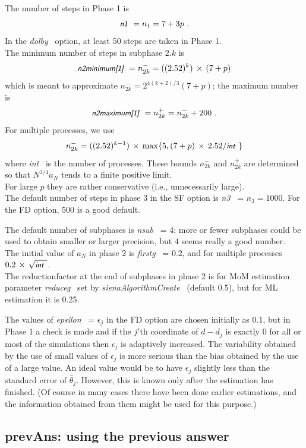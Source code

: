 \documentclass[a4paper,12pt,fleqn]{article}
\newcommand{\ttimes}{\,\times\,}
\newcommand{\nnm}[1]{\textsf{\small\textit{#1}\ }}
\begin{document}
The number of steps in Phase 1 is
\[
\nnm{n1} =  n_1 = 7 + 3p \ .
\]
In the \nnm{dolby} option, at least 50 steps are taken in Phase 1.\\
The minimum number of steps in subphase $2.k$ is
\[
\nnm{n2minimum[1]} = n_{2k}^- = ((2.52)^k)\ttimes(7+p)
\]
 which is meant to approximate
$n_{2k}^- = 2^{4(k+2)/3}(7+p)$;
the maximum number is
\[
\nnm{n2maximum[1]} = n_{2k}^+ = n_{2k}^- + 200 \ .
\]
For multiple processes, we use
\[
  n_{2k}^- = ((2.52)^{k-1})\ttimes \max \{5, (7+p)\ttimes 2.52/\nnm{int}\}
\]
where \nnm{int} is the number of processes.
These bounds $n_{2k}^-$ and $n_{2k}^+$ are determined so that
$N^{3/4} a_N$ tends to a finite positive limit.\\
For large $p$ they are rather conservative (i.e., unnecessarily large).\\
The default number of steps in phase 3 in the SF option is \nnm{n3} = $n_3 = 1000$.
For the FD option, 500 is a good default.

The default number of subphases is \nnm{nsub} = 4;
more or fewer subphases could be used
to obtain smaller or larger precision, but 4 seems really a good number.\\
The initial value of $a_N$ in phase 2 is \nnm{firstg} = 0.2,
and for multiple processes $0.2 \ttimes \sqrt{\nnm{int}}$.\\
The reductionfactor at the end of subphases in phase 2 is
for MoM estimation parameter \nnm{reduceg}
set by \nnm{sienaAlgorithmCreate} (default 0.5), but for ML estimation
it is 0.25.

The values of \nnm{epsilon} = $\epsilon_j$ in the FD option
are chosen initially as 0.1,
but in Phase 1 a check is made and if
the $j'$th coordinate of $d - d_j$ is exactly 0 for all or most
of the simulations then $\epsilon_j$ is adaptively increased.
The variability obtained
by the use of small values of $\epsilon_j$ is more serious than the bias obtained
by the use of a large value.
An ideal value would be to have $\epsilon_j$ slightly less than the
standard error of $\hat\theta_j$. However, this is known only
after the estimation has finished. (Of course in many cases there
have been done earlier estimations, and the information obtained
from them might be used for this purpose.)

\subsection{prevAns: using the previous answer}
\end{document}
